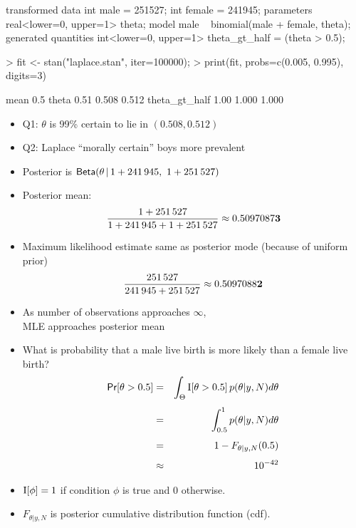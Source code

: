 \documentclass[10pt]{report}
\begin{document}
%
\begin{stancode}
transformed data {
  int male = 251527;
  int female = 241945;
}
parameters {
  real<lower=0, upper=1> theta;
}
model {
  male ~ binomial(male + female, theta);
}
generated quantities {
  int<lower=0, upper=1> theta_gt_half = (theta > 0.5);
}
\end{stancode}


%
\begin{codein}
> fit <- stan("laplace.stan", iter=100000);
> print(fit, probs=c(0.005, 0.995), digits=3)
\end{codein}
\begin{codeout}
                    mean   0.5%
theta               0.51  0.508  0.512
theta_gt_half       1.00  1.000  1.000
\end{codeout}
%
\begin{itemize}
\item Q1: $\theta$ is 99\% certain to lie in $(0.508, 0.512)$
%
\item Q2:  Laplace ``morally certain'' boys more prevalent
\end{itemize}


%
\begin{itemize}
\item Posterior is $\text{\sf Beta}(\theta \, | \, 1 + 241\,945, \ 1 + 251\,527)$
\item Posterior mean:
\[
\frac{1 + 251\,527}
     {1 + 241\,945 + 1 + 251\,527}
\approx 0.5097087{\bf3}
\]
\item Maximum likelihood estimate same as posterior mode (because
  of uniform prior)
\[
\frac{251\,527}
     {241\,945 + 251\,527}
\approx 0.5097088{\bf2}
\]
\item As number of observations approaches $\infty$,
\\
MLE approaches posterior mean
\end{itemize}


%
\begin{itemize}
\item What is probability that a male live birth is more likely than a
  female live birth?
\begin{eqnarray*}
\text{\sf Pr}[\theta > 0.5]
& = &  \int_{\Theta} \text{I}[\theta > 0.5] \, p(\theta|y,N) d\theta
\\[4pt]
& = &  \int_{0.5}^1 p(\theta|y,N) d\theta
\\[4pt]
& = &  1 - F_{\theta|y,N}(0.5)
\\[4pt]
& \approx &  10^{-42}
\end{eqnarray*}
\item $\text{I}[\phi] = 1$ if condition $\phi$ is true and 0 otherwise.
\item  $F_{\theta|y,N}$ is posterior cumulative distribution
function (cdf).
\end{itemize}
\end{document}
